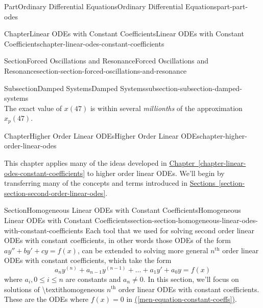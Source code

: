 \documentclass[twoside,10pt,]{book}
\newcommand{\xreffont}{\relax}
\numberwithin{equation}{part}
\renewcommand{\th}{\text{th}}
\begin{document}
\begin{partptx}{Part}{Ordinary Differential Equations}{}{Ordinary Differential Equations}{}{}{part-part-odes}
\begin{chapterptx}{Chapter}{Linear ODEs with Constant Coefficients}{}{Linear ODEs with Constant Coefficients}{}{}{chapter-linear-odes-constant-coefficients}
\begin{sectionptx}{Section}{Forced Oscillations and Resonance}{}{Forced Oscillations and Resonance}{}{}{section-section-forced-oscillations-and-resonance}
\begin{subsectionptx}{Subsection}{Damped Systems}{}{Damped Systems}{}{}{subsection-subsection-damped-systems}
\begin{equation*}
\end{equation*}
The exact value of \(x(47)\) is within several \emph{millionths} of the approximation \(x_{p}(47)\).%
\end{subsectionptx}
\end{sectionptx}
\end{chapterptx}
%
\typeout{************************************************}
\typeout{************************************************}
%
\begin{chapterptx}{Chapter}{Higher Order Linear ODEs}{}{Higher Order Linear ODEs}{}{}{chapter-higher-order-linear-odes}
\renewcommand*{\chaptername}{Chapter}
\begin{introduction}{}%
This chapter applies many of the ideas developed in \hyperref[chapter-linear-odes-constant-coefficients]{Chapter~{\xreffont\ref{chapter-linear-odes-constant-coefficients}}} to higher order linear ODEs. We'll begin by transferring many of the concepts and terms introduced in \hyperref[section-section-second-order-linear-odes]{Sections~{\xreffont\ref{section-section-second-order-linear-odes}}\textendash{}{\xreffont\ref{section-section-homogeneous-odes-with-constant-coefficients}}}.%
\end{introduction}%
%
%
\typeout{************************************************}
\typeout{************************************************}
%
\begin{sectionptx}{Section}{Homogeneous Linear ODEs with Constant Coefficients}{}{Homogeneous Linear ODEs with Constant Coefficients}{}{}{section-section-homogeneous-linear-odes-with-constant-coefficients}
Each tool that we used for solving second order linear ODEs with constant coefficients, in other words those ODEs of the form \(ay''+by'+cy=f(x)\), can be extended to solving more general \(n^{\text{th}}\) order linear ODEs with constant coefficients, which take the form%
\begin{equation}
a_{n}y^{(n)}+a_{n-1}y^{(n-1)}+\dots+a_{1}y'+a_{0}y=f(x)\label{men-equation-constant-coeffs}
\end{equation}
where \(a_{i},0\leq i\leq n\) are constants and \(a_{n}\neq0\). In this section, we'll focus on solutions of \textbackslash{}textit\textbraceleft{}homogeneous\textbraceright{} \(n^{\th}\) order linear ODEs with constant coefficients. These are the ODEs where \(f(x) = 0\) in \hyperref[men-equation-constant-coeffs]{({\xreffont\ref{men-equation-constant-coeffs}})}.%
\par

\end{sectionptx}
\end{chapterptx}
\end{partptx}
\end{document}
